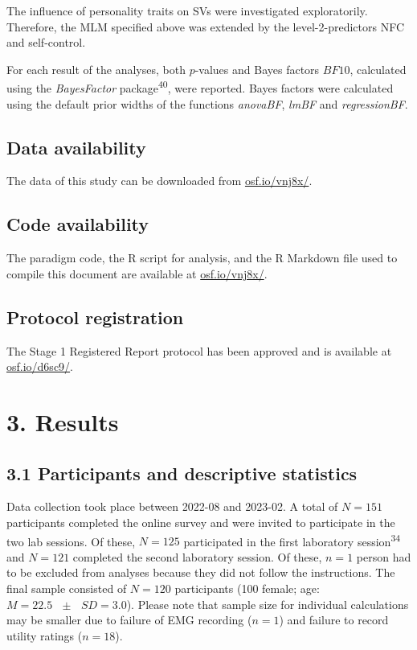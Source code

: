 \documentclass[
  man,floatsintext]{apa6}
\begin{document}
The influence of personality traits on SVs were investigated exploratorily.
Therefore, the MLM specified above was extended by the level-2-predictors NFC and self-control.

For each result of the analyses, both \(p\)-values and Bayes factors \(BF10\), calculated using the \emph{BayesFactor} package\textsuperscript{40}, were reported.
Bayes factors were calculated using the default prior widths of the functions \emph{anovaBF}, \emph{lmBF} and \emph{regressionBF}.

\hypertarget{data-availability}{%
\subsection{Data availability}\label{data-availability}}

The data of this study can be downloaded from \href{https://osf.io/vnj8x/}{osf.io/vnj8x/}.

\hypertarget{code-availability}{%
\subsection{Code availability}\label{code-availability}}

The paradigm code, the R script for analysis, and the R Markdown file used to compile this document are available at \href{https://osf.io/vnj8x/}{osf.io/vnj8x/}.

\hypertarget{protocol-registration}{%
\subsection{Protocol registration}\label{protocol-registration}}

The Stage 1 Registered Report protocol has been approved and is available at \href{https://osf.io/d6sc9/}{osf.io/d6sc9/}.

\hypertarget{results}{%
\section{3. Results}\label{results}}

\hypertarget{participants-and-descriptive-statistics}{%
\subsection{3.1 Participants and descriptive statistics}\label{participants-and-descriptive-statistics}}

Data collection took place between 2022-08 and 2023-02.
A total of \(N=151\) participants completed the online survey and were invited to participate in the two lab sessions.
Of these, \(N=125\) participated in the first laboratory session\textsuperscript{34} and \(N=121\) completed the second laboratory session.
Of these, \(n=1\) person had to be excluded from analyses because they did not follow the instructions.
The final sample consisted of \(N=120\) participants (100 female; age: \(M=22.5\text{ }\pm\text{ }SD = 3.0\)).
Please note that sample size for individual calculations may be smaller due to failure of EMG recording (\(n=1\)) and failure to record utility ratings (\(n=18\)).
\end{document}
